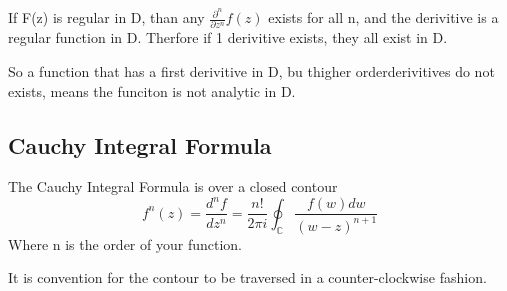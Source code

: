\documentclass{article}
\newcommand{\be}{\begin{equation}}
\newcommand{\ee}{\end{equation}}
\newcommand{\pd}{\partial}
\begin{document}
If F(z) is regular in D, than any $\frac{\pd^n}{\pd z^n}f(z)$ exists for all n, and the derivitive is a regular function in D.
Therfore if 1 derivitive exists, they all exist in D.

So a function that has a first derivitive in D, bu thigher orderderivitives do not exists, means the funciton is not analytic in D. 

\subsection*{Cauchy Integral Formula}
The Cauchy Integral Formula is over a closed contour
\be
f^{n}(z) = \frac{d^n f}{dz^n}  = \frac{n!}{2\pi i } \oint_\mathbb{C} \frac{f(w) dw}{(w-z)^{n+1}}
\ee
Where n is the order of your function.

It is convention for the contour to be traversed in a counter-clockwise fashion. 

\end{document}
